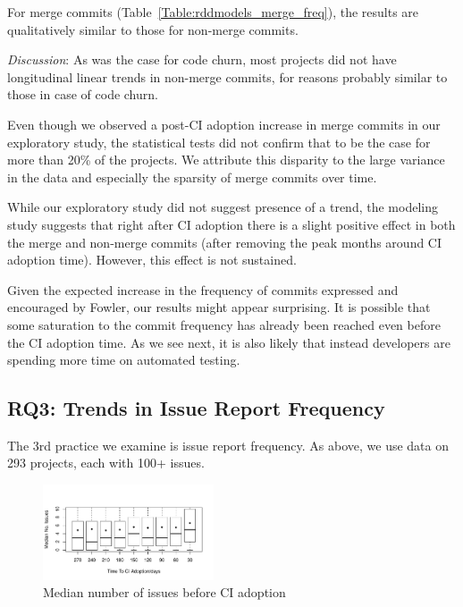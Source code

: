 For merge commits (Table~\ref{Table:rddmodels_merge_freq}), the results 
are qualitatively similar to those for non-merge commits.

\smallskip\noindent \emph{Discussion}:
As was the case for code churn, most projects did not have longitudinal 
linear trends in non-merge commits, for reasons probably similar to those 
in case of code churn.

Even though  we observed a post-CI adoption increase in merge commits 
in our exploratory study, the statistical tests did not confirm that to be the 
case for more than 20\% of the projects. 
We attribute this disparity to the large variance in the data and especially 
the sparsity of merge commits over time. 

While our exploratory study did not suggest presence of a trend, the 
modeling study suggests that right after CI adoption there is a slight 
positive effect in both the merge and non-merge commits (after removing the peak months around CI adoption time). 
However, this effect is not sustained.

Given the expected increase in the frequency of commits expressed and 
encouraged by Fowler, our results might appear surprising.
It is possible that some saturation to the commit frequency has already 
been reached even before the CI adoption time.
As we see next, it is also likely that instead developers are spending more time on 
automated testing.





\subsection{RQ3: Trends in Issue Report Frequency}

The 3rd practice we examine is issue report frequency.
As above, we use data on 293 projects, each with 
100+ issues.

\begin{figure}[t]
\centering
\includegraphics[width=0.45\textwidth, clip=true, trim=0 15 15 50]{issues_before.pdf}
\caption{Median number of issues before CI adoption}
\label{Fig:IssuesBefore}
\end{figure}


